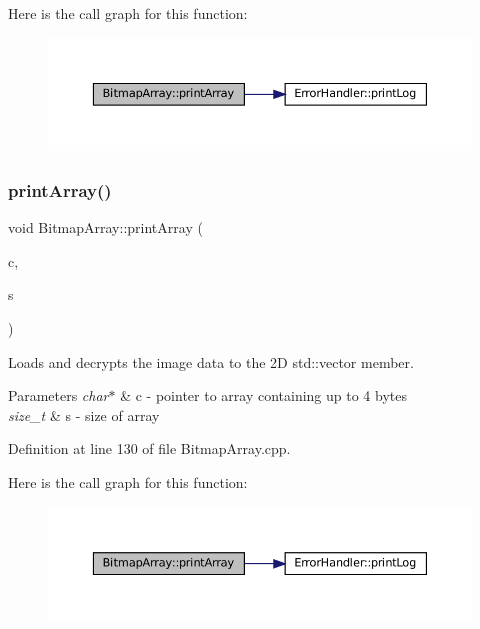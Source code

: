 Here is the call graph for this function\+:\nopagebreak
\begin{figure}[H]
\begin{center}
\leavevmode
\includegraphics[width=350pt]{classBitmapArray_a0580ddeedca7f59fd8d43ec92e6bb4a1_cgraph}
\end{center}
\end{figure}
\mbox{\label{classBitmapArray_a99a8a164e51e29407f24dab4752232c1}} 
\subsubsection{\texorpdfstring{printArray()}{printArray()}\hspace{0.1cm}{\footnotesize\ttfamily [2/2]}}
{\footnotesize\ttfamily void Bitmap\+Array\+::print\+Array (\begin{DoxyParamCaption}\item[{char $\ast$}]{c,  }\item[{size\+\_\+t}]{s }\end{DoxyParamCaption})\hspace{0.3cm}{\ttfamily [private]}}



Loads and decrypts the image data to the 2D std\+::vector member. 


\begin{DoxyParams}{Parameters}
{\em char$\ast$} & c -\/ pointer to array containing up to 4 bytes \\
\hline
{\em size\+\_\+t} & s -\/ size of array \\
\hline
\end{DoxyParams}


Definition at line 130 of file Bitmap\+Array.\+cpp.

Here is the call graph for this function\+:\nopagebreak
\begin{figure}[H]
\begin{center}
\leavevmode
\includegraphics[width=350pt]{classBitmapArray_a99a8a164e51e29407f24dab4752232c1_cgraph}
\end{center}
\end{figure}
\mbox{\label{classBitmapArray_a3a5834d03cd095769b422d4d66b9435f}} 
